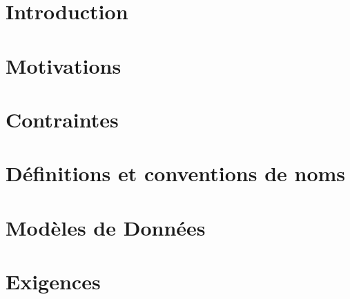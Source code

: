 



\pagestyle{fancy} 






\tableofcontents
{}


\chapter{Introduction}


\chapter{Motivations}


\chapter{Contraintes}


\chapter{Définitions et conventions de noms}


\chapter{Modèles de Données}



\chapter{Exigences}




\pagestyle{fancy} 










